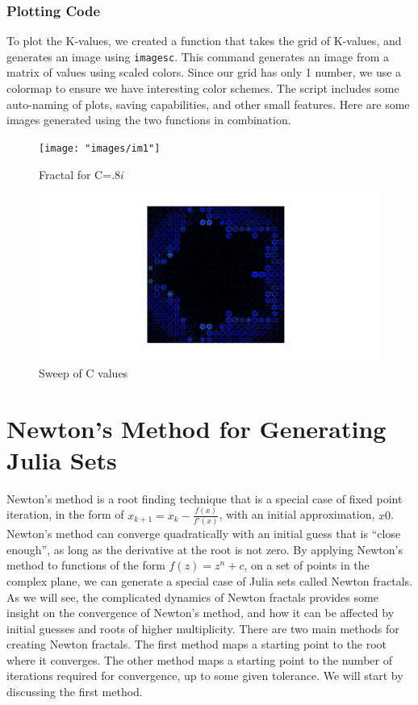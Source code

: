 \documentclass[12pt]{article}
\begin{document}
\begin{onehalfspace}
\subsubsection*{Plotting Code}	
To plot the K-values, we created a function that takes the grid of K-values, and generates an image using \verb|imagesc|. This command generates an image from a matrix of values using scaled colors. Since our grid has only 1 number, we use a colormap to ensure we have interesting color schemes. The script includes some auto-naming of plots, saving capabilities, and other small features. Here are some images generated using the two functions in combination.
\begin{figure}[H]
	\centering
	\texttt{[image: "images/im1"]}
	\caption{Fractal for C=$.8i$}
	\label{fig:}
\end{figure}
\begin{figure}[H]
\centering
\includegraphics[width=.7\linewidth]{"images/sweep1"}
\caption{Sweep of C values}
\label{fig:untitled3}
\end{figure}
\section*{Newton’s Method for Generating Julia Sets}
Newton’s method is a root finding technique that is a special case of fixed point iteration, in the form of  $x_{k+1}=x_k - \frac{f(x)}{f'(x)}$,  with an initial approximation, $x0$.  Newton’s method can converge quadratically with an initial guess that is “close enough”, as long as the derivative at the root is not zero.  By applying Newton’s method to functions of the form $f(z) = z^n + c$,  on a set of points in the complex plane, we can generate a special case of Julia sets called Newton fractals.  As we will see, the complicated dynamics of Newton fractals provides some insight on the convergence of Newton’s method, and how it can be affected by initial guesses and roots of higher multiplicity.  There  are two main methods for creating Newton fractals.  The first method maps a starting point to the root where it converges.  The other method maps a starting point to the number of iterations required for convergence, up to some given tolerance.   We will start by discussing the first method.

\end{onehalfspace}
\end{document}
